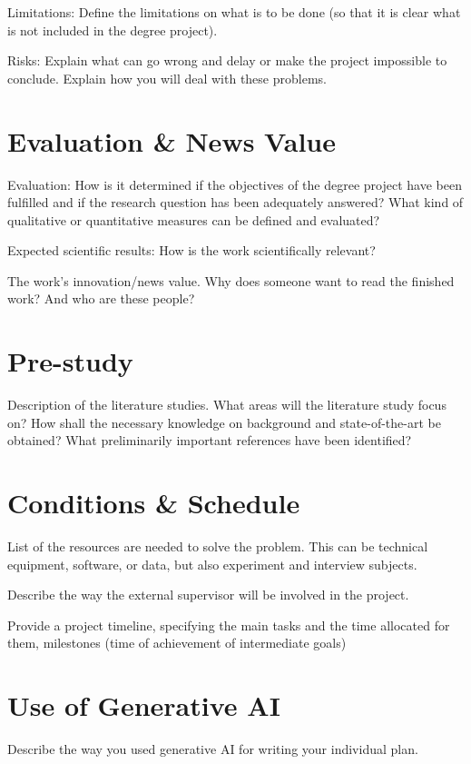 \documentclass{article}
\begin{document}
Limitations: Define the limitations on what is to be done (so that it is clear what is not included in the degree project).

Risks: Explain what can go wrong and delay or make the project impossible to conclude. Explain how you will deal with these problems.

\section{Evaluation \& News Value}

Evaluation: How is it determined if the objectives of the degree project have been fulfilled and if the research question has been adequately answered? What kind of qualitative or quantitative measures can be defined and evaluated?

Expected scientific results: How is the work scientifically relevant?

The work's innovation/news value. Why does someone want to read the finished work? And who are these people?

\section{Pre-study}

Description of the literature studies. What areas will the literature study focus on? How shall the necessary knowledge on background and state-of-the-art be obtained? What preliminarily important references have been identified?

\section{Conditions \& Schedule}
List of the resources are needed to solve the problem. This can be technical equipment, software, or data, but also experiment and interview subjects.

Describe the way the external supervisor will be involved in the project.

Provide a project timeline, specifying the main tasks and the time allocated for them, milestones (time of achievement of intermediate goals)

\section{Use of Generative AI}

Describe the way you used generative AI for writing your individual plan.



\end{document}
